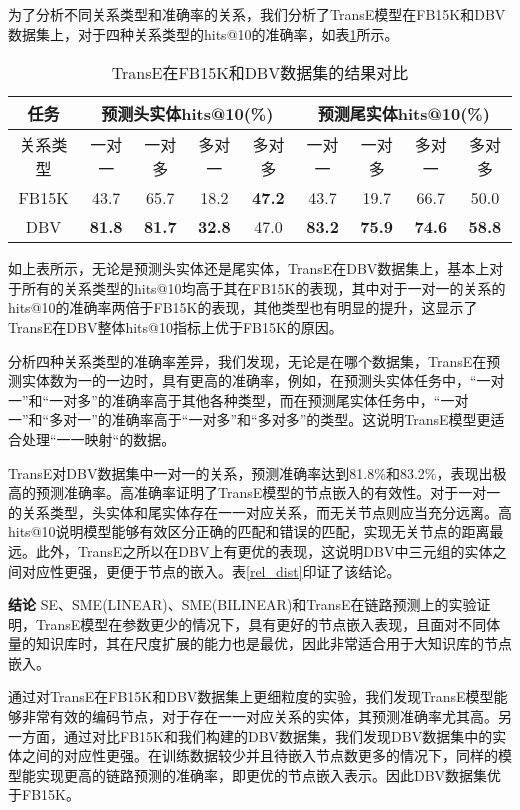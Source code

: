 为了分析不同关系类型和准确率的关系，我们分析了TransE模型在FB15K和DBV数据集上，对于四种关系类型的hits@10的准确率，如表\ref{rel_hits10}所示。
\begin{table}[H]
\centering
\caption{TransE在FB15K和DBV数据集的结果对比}
\begin{tabular}{ccccccccc}
\toprule
任务 & \multicolumn{4}{c}{预测头实体hits@10(\%)} & \multicolumn{4}{c}{预测尾实体hits@10(\%)} \\
\midrule
关系类型 & 一对一 & 一对多 & 多对一 & 多对多 & 一对一 & 一对多 & 多对一 & 多对多\\
\midrule
FB15K & 43.7 & 65.7 & 18.2 & \textbf{47.2} & 43.7 & 19.7 & 66.7 & 50.0\\
DBV   & \textbf{81.8} & \textbf{81.7} & \textbf{32.8} & 47.0 & \textbf{83.2} & \textbf{75.9} & \textbf{74.6} & \textbf{58.8}\\
\bottomrule
\end{tabular}
\label{rel_hits10}
\end{table}

如上表所示，无论是预测头实体还是尾实体，TransE在DBV数据集上，基本上对于所有的关系类型的hits@10均高于其在FB15K的表现，其中对于一对一的关系的hits@10的准确率两倍于FB15K的表现，其他类型也有明显的提升，这显示了TransE在DBV整体hits@10指标上优于FB15K的原因。

分析四种关系类型的准确率差异，我们发现，无论是在哪个数据集，TransE在预测实体数为一的一边时，具有更高的准确率，例如，在预测头实体任务中，“一对一”和“一对多”的准确率高于其他各种类型，而在预测尾实体任务中，“一对一”和“多对一”的准确率高于“一对多”和“多对多”的类型。这说明TransE模型更适合处理“一一映射“的数据。

TransE对DBV数据集中一对一的关系，预测准确率达到81.8\%和83.2\%，表现出极高的预测准确率。高准确率证明了TransE模型的节点嵌入的有效性。对于一对一的关系类型，头实体和尾实体存在一一对应关系，而无关节点则应当充分远离。高hits@10说明模型能够有效区分正确的匹配和错误的匹配，实现无关节点的距离最远。此外，TransE之所以在DBV上有更优的表现，这说明DBV中三元组的实体之间对应性更强，更便于节点的嵌入。表\ref{rel_dist}印证了该结论。

\textbf{结论}\qquad
SE、SME(LINEAR)、SME(BILINEAR)和TransE在链路预测上的实验证明，TransE模型在参数更少的情况下，具有更好的节点嵌入表现，且面对不同体量的知识库时，其在尺度扩展的能力也是最优，因此非常适合用于大知识库的节点嵌入。

通过对TransE在FB15K和DBV数据集上更细粒度的实验，我们发现TransE模型能够非常有效的编码节点，对于存在一一对应关系的实体，其预测准确率尤其高。另一方面，通过对比FB15K和我们构建的DBV数据集，我们发现DBV数据集中的实体之间的对应性更强。在训练数据较少并且待嵌入节点数更多的情况下，同样的模型能实现更高的链路预测的准确率，即更优的节点嵌入表示。因此DBV数据集优于FB15K。

